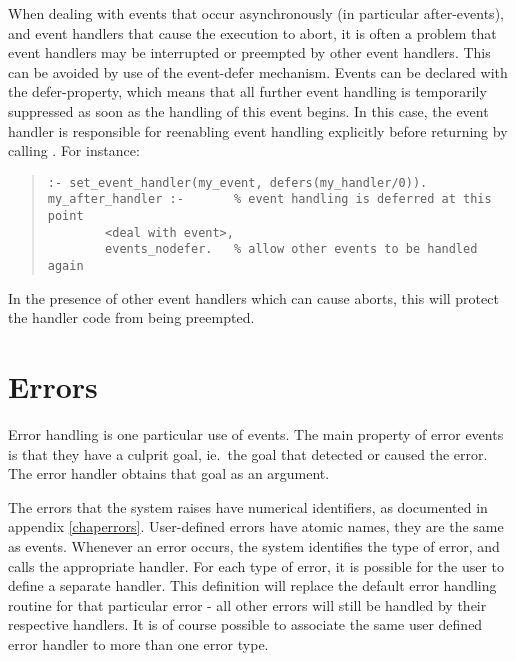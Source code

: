 When dealing with events that occur asynchronously (in particular after-events),
and event handlers that cause the execution to abort, it is often a problem
that event handlers may be interrupted or preempted by other event handlers.
This can be avoided by use of the event-defer mechanism. Events can be
declared with the defer-property, which means that all further event handling
is temporarily suppressed as soon as the handling of this event begins.
In this case, the event handler is responsible for reenabling event handling
explicitly before returning by calling
.
For instance:
\begin{quote}\begin{verbatim}
:- set_event_handler(my_event, defers(my_handler/0)).
my_after_handler :-       % event handling is deferred at this point
        <deal with event>,
        events_nodefer.   % allow other events to be handled again
\end{verbatim}\end{quote}
In the presence of other event handlers which can cause aborts, this will
protect the handler code from being preempted.


\section{Errors}
Error handling is one particular use of events.
The main property of error events is that they have a culprit goal,
ie.\ the goal that detected or caused the error.
The error handler obtains that goal as an argument.

The errors that the system raises have numerical identifiers,
as documented in appendix \ref{chaperrors}.
User-defined errors have atomic names, they are the same as events.
Whenever an error occurs, the {\eclipse} system identifies the type of error, and
calls the appropriate handler. For each type of error, it is possible
for the user to define a separate handler. This definition will replace
the default error handling routine for that particular error - all other
errors will still
be handled by their respective
handlers.
It is of
course possible to associate the same user defined error handler to more
than one error type.

